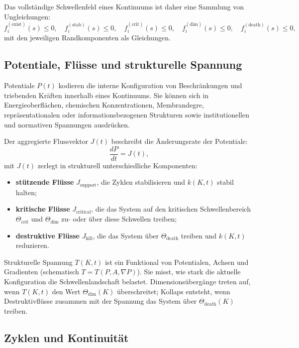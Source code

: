 Das vollständige Schwellenfeld eines Kontinuums ist daher eine Sammlung von
Ungleichungen:
\[
    f_{i}^{(\mathrm{exist})}(s) \le 0,\quad
    f_{i}^{(\mathrm{stab})}(s) \le 0,\quad
    f_{i}^{(\mathrm{crit})}(s) \le 0,\quad
    f_{i}^{(\mathrm{dim})}(s) \le 0,\quad
    f_{i}^{(\mathrm{death})}(s) \le 0,
\]
mit den jeweiligen Randkomponenten als Gleichungen.
\subsection{Potentiale, Flüsse und strukturelle Spannung}

Potentiale \(P(t)\) kodieren die interne Konfiguration von Beschränkungen und
triebenden Kräften innerhalb eines Kontinuums.
Sie können sich in Energieoberflächen, chemischen Konzentrationen,
Membrandegre, repräsentationalen oder informationsbezogenen Strukturen sowie
institutionellen und normativen Spannungen ausdrücken.

Der aggregierte Flussvektor \(J(t)\) beschreibt die Änderungsrate der
Potentiale:
\[
    \frac{dP}{dt} = J(t),
\]
mit \(J(t)\) zerlegt in strukturell unterschiedliche Komponenten:
\begin{itemize}
    \item \textbf{stützende Flüsse} \(J_{\mathrm{support}}\), die Zyklen
          stabilisieren und \(k(K,t)\) stabil halten;
    \item \textbf{kritische Flüsse} \(J_{\mathrm{critical}}\), die das System auf
den kritischen Schwellenbereich \(\Theta_{\mathrm{crit}}\) und
          \(\Theta_{\mathrm{dim}}\) zu- oder über diese Schwellen treiben;
    \item \textbf{destruktive Flüsse} \(J_{\mathrm{kill}}\), die das System über
          \(\Theta_{\mathrm{death}}\) treiben und \(k(K,t)\) reduzieren.
\end{itemize}

Strukturelle Spannung \(T(K,t)\) ist ein Funktional von Potentialen, Achsen und
Gradienten (schematisch \(T=T(P,A,\nabla P)\)).
Sie misst, wie stark die aktuelle Konfiguration die Schwellenlandschaft belastet.
Dimensionsübergänge treten auf, wenn \(T(K,t)\) den Wert
\(\Theta_{\mathrm{dim}}(K)\) überschreitet; Kollaps entsteht, wenn
Destruktivflüsse zusammen mit der Spannung das System über
\(\Theta_{\mathrm{death}}(K)\) treiben.

\subsection{Zyklen und Kontinuität}

